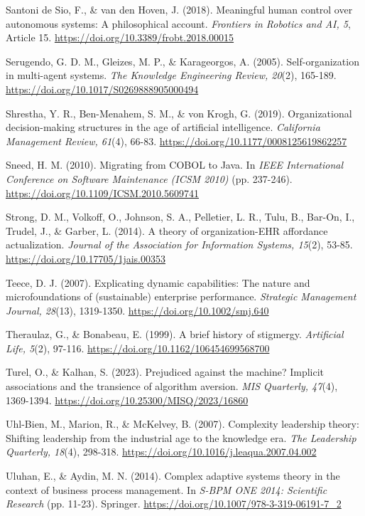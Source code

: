\documentclass[12pt,a4paper]{article}
\begin{document}
Santoni de Sio, F., \& van den Hoven, J. (2018). Meaningful human
control over autonomous systems: A philosophical account.
\emph{Frontiers in Robotics and AI, 5}, Article 15.
\url{https://doi.org/10.3389/frobt.2018.00015}

Serugendo, G. D. M., Gleizes, M. P., \& Karageorgos, A. (2005).
Self-organization in multi-agent systems. \emph{The Knowledge
Engineering Review, 20}(2), 165-189.
\url{https://doi.org/10.1017/S0269888905000494}

Shrestha, Y. R., Ben-Menahem, S. M., \& von Krogh, G. (2019).
Organizational decision-making structures in the age of artificial
intelligence. \emph{California Management Review, 61}(4), 66-83.
\url{https://doi.org/10.1177/0008125619862257}

Sneed, H. M. (2010). Migrating from COBOL to Java. In \emph{IEEE
International Conference on Software Maintenance (ICSM 2010)} (pp.
237-246). \url{https://doi.org/10.1109/ICSM.2010.5609741}

Strong, D. M., Volkoff, O., Johnson, S. A., Pelletier, L. R., Tulu, B.,
Bar-On, I., Trudel, J., \& Garber, L. (2014). A theory of
organization-EHR affordance actualization. \emph{Journal of the
Association for Information Systems, 15}(2), 53-85.
\url{https://doi.org/10.17705/1jais.00353}

Teece, D. J. (2007). Explicating dynamic capabilities: The nature and
microfoundations of (sustainable) enterprise performance.
\emph{Strategic Management Journal, 28}(13), 1319-1350.
\url{https://doi.org/10.1002/smj.640}

Theraulaz, G., \& Bonabeau, E. (1999). A brief history of stigmergy.
\emph{Artificial Life, 5}(2), 97-116.
\url{https://doi.org/10.1162/106454699568700}

Turel, O., \& Kalhan, S. (2023). Prejudiced against the machine?
Implicit associations and the transience of algorithm aversion.
\emph{MIS Quarterly, 47}(4), 1369-1394.
\url{https://doi.org/10.25300/MISQ/2023/16860}

Uhl-Bien, M., Marion, R., \& McKelvey, B. (2007). Complexity leadership
theory: Shifting leadership from the industrial age to the knowledge
era. \emph{The Leadership Quarterly, 18}(4), 298-318.
\url{https://doi.org/10.1016/j.leaqua.2007.04.002}

Uluhan, E., \& Aydin, M. N. (2014). Complex adaptive systems theory in
the context of business process management. In \emph{S-BPM ONE 2014:
Scientific Research} (pp. 11-23). Springer.
\url{https://doi.org/10.1007/978-3-319-06191-7_2}
\end{document}
